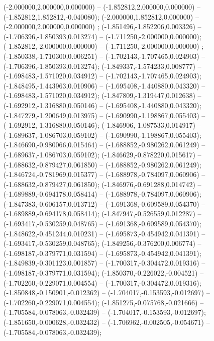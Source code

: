  (-2.000000,2.000000,0.000000) -- (-1.852812,2.000000,0.000000) -- (-1.852812,1.852812,-0.040080);
 (-2.000000,1.852812,0.000000) -- (-2.000000,2.000000,0.000000) ;
 (-1.851496,-1.852206,0.003326) -- (-1.706396,-1.850393,0.013274) -- (-1.711250,-2.000000,0.000000);
 (-1.852812,-2.000000,0.000000) -- (-1.711250,-2.000000,0.000000) ;
 (-1.850338,-1.710300,0.006251) -- (-1.702143,-1.707465,0.024903) -- (-1.706396,-1.850393,0.013274);
 (-1.849337,-1.574233,0.008777) -- (-1.698483,-1.571020,0.034912) -- (-1.702143,-1.707465,0.024903);
 (-1.848495,-1.443963,0.010906) -- (-1.695408,-1.440880,0.043320) -- (-1.698483,-1.571020,0.034912);
 (-1.847809,-1.319447,0.012638) -- (-1.692912,-1.316880,0.050146) -- (-1.695408,-1.440880,0.043320);
 (-1.847279,-1.200649,0.013975) -- (-1.690990,-1.198867,0.055403) -- (-1.692912,-1.316880,0.050146);
 (-1.846906,-1.087533,0.014917) -- (-1.689637,-1.086703,0.059102) -- (-1.690990,-1.198867,0.055403);
 (-1.846690,-0.980066,0.015464) -- (-1.688852,-0.980262,0.061249) -- (-1.689637,-1.086703,0.059102);
 (-1.846629,-0.878220,0.015617) -- (-1.688632,-0.879427,0.061850) -- (-1.688852,-0.980262,0.061249);
 (-1.846724,-0.781969,0.015377) -- (-1.688978,-0.784097,0.060906) -- (-1.688632,-0.879427,0.061850);
 (-1.846976,-0.691288,0.014742) -- (-1.689889,-0.694178,0.058414) -- (-1.688978,-0.784097,0.060906);
 (-1.847383,-0.606157,0.013712) -- (-1.691368,-0.609589,0.054370) -- (-1.689889,-0.694178,0.058414);
 (-1.847947,-0.526559,0.012287) -- (-1.693417,-0.530259,0.048765) -- (-1.691368,-0.609589,0.054370);
 (-1.848622,-0.451244,0.010231) -- (-1.695873,-0.454942,0.041391) -- (-1.693417,-0.530259,0.048765);
 (-1.849256,-0.376200,0.006774) -- (-1.698187,-0.379771,0.031594) -- (-1.695873,-0.454942,0.041391);
 (-1.849839,-0.301123,0.001857) -- (-1.700317,-0.304472,0.019316) -- (-1.698187,-0.379771,0.031594);
 (-1.850370,-0.226022,-0.004521) -- (-1.702260,-0.229071,0.004554) -- (-1.700317,-0.304472,0.019316);
 (-1.850848,-0.150901,-0.012362) -- (-1.704017,-0.153593,-0.012697) -- (-1.702260,-0.229071,0.004554);
 (-1.851275,-0.075768,-0.021666) -- (-1.705584,-0.078063,-0.032439) -- (-1.704017,-0.153593,-0.012697);
 (-1.851650,-0.000628,-0.032432) -- (-1.706962,-0.002505,-0.054671) -- (-1.705584,-0.078063,-0.032439);
